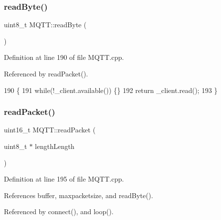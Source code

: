 \subsubsection{read\+Byte()}
{\footnotesize\ttfamily uint8\+\_\+t M\+Q\+T\+T\+::read\+Byte (\begin{DoxyParamCaption}{ }\end{DoxyParamCaption})\hspace{0.3cm}{\ttfamily [private]}}



Definition at line 190 of file M\+Q\+T\+T.\+cpp.



Referenced by read\+Packet().


\begin{DoxyCode}
190                        \{
191     \textcolor{keywordflow}{while}(!_client.available()) \{\}
192     \textcolor{keywordflow}{return} _client.read();
193 \}
\end{DoxyCode}
\mbox{\label{class_m_q_t_t_a78d0e70a566c983f13b002b88c467267}} 
\subsubsection{read\+Packet()}
{\footnotesize\ttfamily uint16\+\_\+t M\+Q\+T\+T\+::read\+Packet (\begin{DoxyParamCaption}\item[{uint8\+\_\+t $\ast$}]{length\+Length }\end{DoxyParamCaption})\hspace{0.3cm}{\ttfamily [private]}}



Definition at line 195 of file M\+Q\+T\+T.\+cpp.



References buffer, maxpacketsize, and read\+Byte().



Referenced by connect(), and loop().


